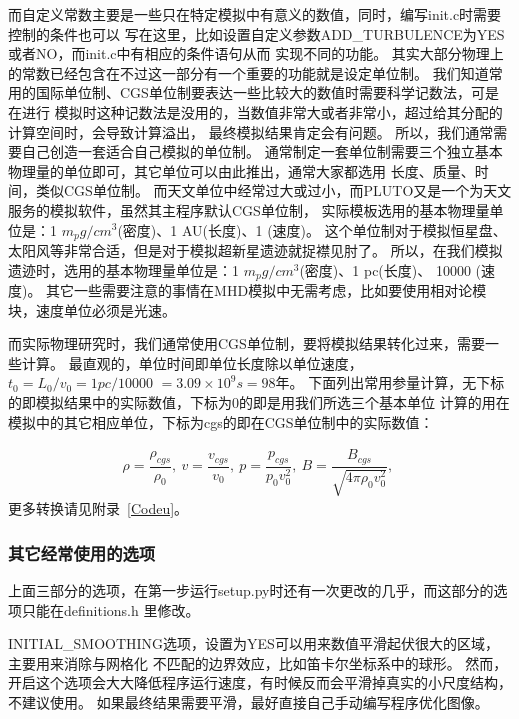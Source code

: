 而自定义常数主要是一些只在特定模拟中有意义的数值，同时，编写init.c时需要控制的条件也可以
写在这里，比如设置自定义参数ADD\_TURBULENCE为YES或者NO，而init.c中有相应的条件语句从而
实现不同的功能。
其实大部分物理上的常数已经包含在不过这一部分有一个重要的功能就是设定单位制。
我们知道常用的国际单位制、CGS单位制要表达一些比较大的数值时需要科学记数法，可是在进行
模拟时这种记数法是没用的，当数值非常大或者非常小，超过给其分配的计算空间时，会导致计算溢出，
最终模拟结果肯定会有问题。
所以，我们通常需要自己创造一套适合自己模拟的单位制。
通常制定一套单位制需要三个独立基本物理量的单位即可，其它单位可以由此推出，通常大家都选用
长度、质量、时间，类似CGS单位制。
而天文单位中经常过大或过小，而PLUTO又是一个为天文服务的模拟软件，虽然其主程序默认CGS单位制，
实际模板选用的基本物理量单位是：1 $m_p g/cm^3$(密度)、1 AU(长度)、1 \kms(速度)。
这个单位制对于模拟恒星盘、太阳风等非常合适，但是对于模拟超新星遗迹就捉襟见肘了。
所以，在我们模拟遗迹时，选用的基本物理量单位是：1 $m_p g/cm^3$(密度)、1 pc(长度)、
10000 \kms(速度)。
其它一些需要注意的事情在MHD模拟中无需考虑，比如要使用相对论模块，速度单位必须是光速。

而实际物理研究时，我们通常使用CGS单位制，要将模拟结果转化过来，需要一些计算。
最直观的，单位时间即单位长度除以单位速度，
$t_0 = L_0/v_0 = 1 pc/10000$ \kms $= 3.09\times10^9 s = 98$年。
下面列出常用参量计算，无下标的即模拟结果中的实际数值，下标为0的即是用我们所选三个基本单位
计算的用在模拟中的其它相应单位，下标为cgs的即在CGS单位制中的实际数值：

\begin{equation}
  \begin{aligned}
    \rho = \dfrac{\rho_{cgs}}{\rho_0} ,   \
    v = \dfrac{v_{cgs}}{v_0} ,   \
    p= \dfrac{p_{cgs}}{p_0v_0^2} ,   \
    B = \dfrac{B_{cgs}}{\sqrt{4\pi\rho_0v_0^2}} ,   \
  \end{aligned}
\end{equation}
更多转换请见附录~\ref{Codeu}。

\subsubsection{其它经常使用的选项}
上面三部分的选项，在第一步运行setup.py时还有一次更改的几乎，而这部分的选项只能在definitions.h
里修改。

INITIAL\_SMOOTHING选项，设置为YES可以用来数值平滑起伏很大的区域，主要用来消除与网格化
不匹配的边界效应，比如笛卡尔坐标系中的球形。
然而，开启这个选项会大大降低程序运行速度，有时候反而会平滑掉真实的小尺度结构，不建议使用。
如果最终结果需要平滑，最好直接自己手动编写程序优化图像。


